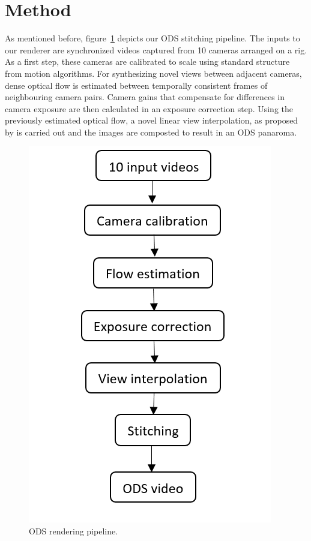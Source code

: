 \documentclass[10pt,twocolumn,letterpaper]{article}
\begin{document}
\section{Method}
\label{method}
As mentioned before, figure~\ref{pipeline} depicts our ODS stitching pipeline. The inputs to our renderer are synchronized videos captured from 10 cameras arranged on a rig. As a first step, these cameras are calibrated to scale using standard structure from motion algorithms. For synthesizing novel views between adjacent cameras, dense optical flow is estimated between temporally consistent frames of neighbouring camera pairs. Camera gains that compensate for differences in camera exposure are then calculated in an exposure correction step. Using the previously estimated optical flow, a novel linear view interpolation, as proposed by \cite{jump16} is carried out and the images are composted to result in an ODS panaroma.  
\begin{figure}[t]
\begin{center}
   \includegraphics[width=0.5\linewidth]{pictures/pipeline.PNG}
\end{center}
   \caption{ODS rendering pipeline. }
\label{pipeline}
\end{figure}
\end{document}
